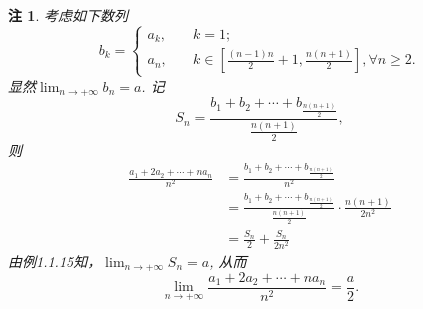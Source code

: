 \documentclass[utf8]{book}
\newtheorem{remark}{注}
\begin{document}
\begin{remark}
考虑如下数列
\begin{equation*}
b_k=
\begin{cases}
a_k,\quad&k=1;\\
a_n,\quad&k\in \left[\frac{(n-1)n}{2}+ 1,\frac{n(n+1)}{2}\right], \forall n\geq 2.
\end{cases}
\end{equation*}
显然$\displaystyle \lim_{n\to +\infty}b_n = a$.
记$$S_n = \frac{b_1+b_2+\cdots+b_{\frac{n(n+1)}{2}}}{\frac{n(n+1)}{2}},$$ 则
\begin{equation*}
\begin{split}
\frac{a_1+2a_2+\cdots+na_n}{n^2} &= \frac{b_1+b_2+\cdots+b_{\frac{n(n+1)}{2}}}{n^2}\\&=\frac{b_1+b_2+\cdots+b_{\frac{n(n+1)}{2}}}{\frac{n(n+1)}{2}}\cdot\frac{n(n+1)}{2n^2}\\&=\frac{S_n}{2}+\frac{S_n}{2n^2}
\end{split}
\end{equation*}
由例1.1.15知，$\displaystyle \lim_{n\to +\infty}S_n = a$, 从而$$\displaystyle \lim_{n\to +\infty}\frac{a_1+2a_2+\cdots+na_n}{n^2} = \frac{a}{2}.$$
\end{remark}
\end{document}
